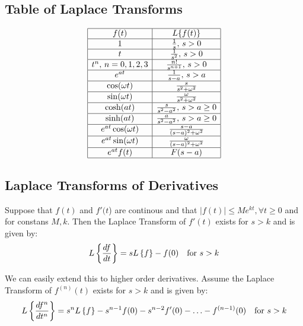 \documentclass[a4paper, 10pt]{article}
\begin{document}
\subsection{Table of Laplace Transforms}
\renewcommand{\arraystretch}{1.5} %
\small$$
  \begin{array}{|c|c|}
    \hline
    f(t)                  & L\{f(t)\}                            \\\hline
    1                     & \frac{1}{s}, \, s > 0                \\\hline
    t                     & \frac{1}{s^2}, \, s > 0              \\\hline
    t^n, \, n = 0,1,2,3   & \frac{n!}{s^{n+1}}, \, s > 0         \\\hline
    e^{at}                & \frac{1}{s - a}, \, s > a            \\\hline
    \cos(\omega t)        & \frac{s}{s^2 + \omega^2}             \\\hline
    \sin(\omega t)        & \frac{\omega}{s^2 + \omega^2}        \\\hline
    \cosh(at)             & \frac{s}{s^2 - a^2}, \, s > a \geq 0 \\\hline
    \sinh(at)             & \frac{a}{s^2 - a^2}, \, s > a \geq 0 \\\hline
    e^{at} \cos(\omega t) & \frac{s - a}{(s - a)^2 + \omega^2}   \\\hline
    e^{at} \sin(\omega t) & \frac{\omega}{(s - a)^2 + \omega^2}  \\\hline
    e^{at} f(t)           & F(s - a)                             \\\hline
  \end{array}
$$

\subsection{Laplace Transforms of Derivatives}
\begin{theorembox}
  Suppose that $f(t)$ and $f'(t$) are continous and that $|f(t)| \leq Me^{kt}, \forall t \geq 0$ and for constans $M, k$. Then the Laplace Transform of $f'(t)$ exists for $s > k$ and is given by:
  $$L \left\{\frac{df}{dt}\right\} = sL\left\{f\right\} - f(0) \quad \text{for} \ s > k$$
\end{theorembox}
\noindent \normalsize We can easily extend this to higher order derivatives. Assume the Laplace Transform of $f^{(n)}(t)$ exists for $s > k$ and is given by:
$$L \left\{\frac{df^n}{dt^n}\right\} = s^nL\left\{f\right\} - s^{n-1}f(0) - s^{n-2}f'(0) - \ldots - f^{(n-1)}(0) \quad \text{for} \ s > k$$
\end{document}
